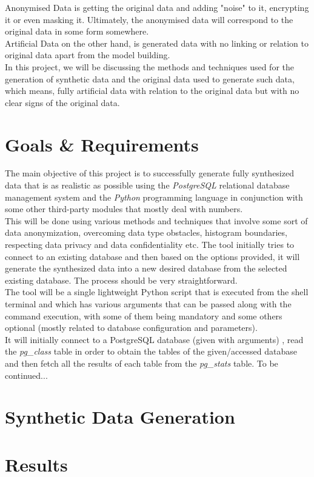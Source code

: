 Anonymised Data is getting the original data and adding "noise" to it, encrypting it or even masking it. Ultimately, the anonymised data will correspond to the original data in some form somewhere.\\
Artificial Data on the other hand, is generated data with no linking or relation to original data apart from the model building.\\
\newline
In this project, we will be discussing the methods and techniques used for the generation of synthetic data and the original data used to generate such data, which means, fully artificial data with relation to the original data but with no clear signs of the original data.
\section{Goals \& Requirements}
The main objective of this project is to successfully generate fully synthesized data that is as realistic as possible using the \textit{PostgreSQL} relational database management system and the \textit{Python} programming language in conjunction with some other third-party modules that mostly deal with numbers.\\
This will be done using various methods and techniques that involve some sort of data anonymization, overcoming data type obstacles, histogram boundaries, respecting data privacy and data confidentiality etc. The tool initially tries to connect to an existing database and then based on the options provided, it will generate the synthesized data into a new desired database from the selected existing database. The process should be very straightforward.\\
The tool will be a single lightweight Python script that is executed from the shell terminal and which has various arguments that can be passed along with the command execution, with some of them being mandatory and some others optional (mostly related to database configuration and parameters).\\
It will initially connect to a PostgreSQL database (given with arguments) , read the \textit{pg\_class} table in order to obtain the tables of the given/accessed database and then fetch all the results of each table from the \textit{pg\_stats} table. 
To be continued...
\section{Synthetic Data Generation}
\lipsum[8-10]
\section{Results}
\lipsum[5-6]